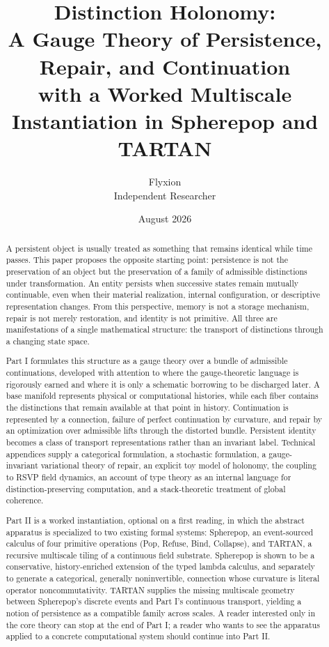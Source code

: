 \documentclass[11pt]{article}
\title{\textbf{Distinction Holonomy: \\ A Gauge Theory of Persistence, Repair, and Continuation} \\[0.3em] \large with a Worked Multiscale Instantiation in Spherepop and TARTAN}
\author{Flyxion \\ \small Independent Researcher}
\date{August 2026}
\begin{document}
\maketitle

\begin{abstract}
\noindent A persistent object is usually treated as something that remains identical while time passes. This paper proposes the opposite starting point: persistence is not the preservation of an object but the preservation of a family of admissible distinctions under transformation. An entity persists when successive states remain mutually continuable, even when their material realization, internal configuration, or descriptive representation changes. From this perspective, memory is not a storage mechanism, repair is not merely restoration, and identity is not primitive. All three are manifestations of a single mathematical structure: the transport of distinctions through a changing state space.

Part I formulates this structure as a gauge theory over a bundle of admissible continuations, developed with attention to where the gauge-theoretic language is rigorously earned and where it is only a schematic borrowing to be discharged later. A base manifold represents physical or computational histories, while each fiber contains the distinctions that remain available at that point in history. Continuation is represented by a connection, failure of perfect continuation by curvature, and repair by an optimization over admissible lifts through the distorted bundle. Persistent identity becomes a class of transport representations rather than an invariant label. Technical appendices supply a categorical formulation, a stochastic formulation, a gauge-invariant variational theory of repair, an explicit toy model of holonomy, the coupling to RSVP field dynamics, an account of type theory as an internal language for distinction-preserving computation, and a stack-theoretic treatment of global coherence.

Part II is a worked instantiation, optional on a first reading, in which the abstract apparatus is specialized to two existing formal systems: Spherepop, an event-sourced calculus of four primitive operations (Pop, Refuse, Bind, Collapse), and TARTAN, a recursive multiscale tiling of a continuous field substrate. Spherepop is shown to be a conservative, history-enriched extension of the typed lambda calculus, and separately to generate a categorical, generally noninvertible, connection whose curvature is literal operator noncommutativity. TARTAN supplies the missing multiscale geometry between Spherepop's discrete events and Part I's continuous transport, yielding a notion of persistence as a compatible family across scales. A reader interested only in the core theory can stop at the end of Part I; a reader who wants to see the apparatus applied to a concrete computational system should continue into Part II.
\end{abstract}
\end{document}
